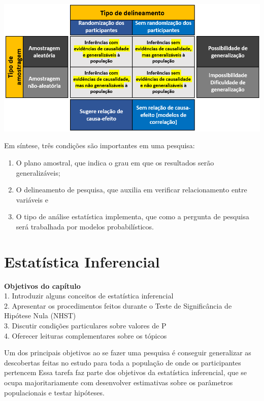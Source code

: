 \documentclass[
]{book}
\providecommand{\tightlist}{%
  \setlength{\itemsep}{0pt}\setlength{\parskip}{0pt}}
\begin{document}
\includegraphics{./img/cap_amostra_delineamento.png}

Em síntese, três condições são importantes em uma pesquisa:

\begin{enumerate}
\def\labelenumi{(\arabic{enumi})}
\tightlist
\item
  O plano amostral, que indica o grau em que os resultados serão
  generalizáveis;
\item
  O delineamento de pesquisa, que auxilia em verificar relacionamento
  entre variáveis e\\
\item
  O tipo de análise estatística implementa, que como a pergunta de
  pesquisa será trabalhada por modelos probabilísticos.
\end{enumerate}

\hypertarget{estatuxedstica-inferencial}{%
\chapter{Estatística Inferencial}\label{estatuxedstica-inferencial}}

\begin{objectives}
\textbf{Objetivos do capítulo}\\
1. Introduzir alguns conceitos de estatística inferencial\\
2. Apresentar os procedimentos feitos durante o Teste de Significância
de Hipótese Nula (NHST)\\
3. Discutir condições particulares sobre valores de P\\
4. Oferecer leituras complementares sobre os tópicos
\end{objectives}

Um dos principais objetivos ao se fazer uma pesquisa é conseguir
generalizar as descobertas feitas no estudo para toda a população de
onde os participantes pertencem Essa tarefa faz parte dos objetivos da
estatística inferencial, que se ocupa majoritariamente com desenvolver
estimativas sobre os parâmetros populacionais e testar hipóteses.
\end{document}
